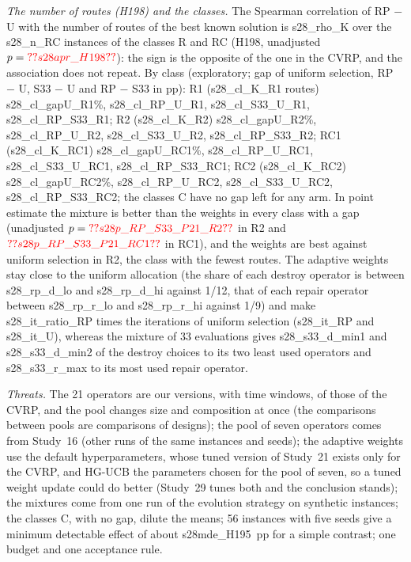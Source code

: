 \emph{The number of routes (H198) and the classes.} The Spearman correlation of RP $-$ U with the number of routes of the best known solution is \num{s28_rho_K} over the \num{s28_n_RC} instances of the classes R and RC (H198, unadjusted $p=\num{s28apr_H198}$): the sign is the opposite of the one in the CVRP, and the association does not repeat. By class (exploratory; gap of uniform selection, RP $-$ U, S33 $-$ U and RP $-$ S33 in pp): R1 (\num{s28_cl_K_R1} routes) \num{s28_cl_gapU_R1}\%, \num{s28_cl_RP_U_R1}, \num{s28_cl_S33_U_R1}, \num{s28_cl_RP_S33_R1}; R2 (\num{s28_cl_K_R2}) \num{s28_cl_gapU_R2}\%, \num{s28_cl_RP_U_R2}, \num{s28_cl_S33_U_R2}, \num{s28_cl_RP_S33_R2}; RC1 (\num{s28_cl_K_RC1}) \num{s28_cl_gapU_RC1}\%, \num{s28_cl_RP_U_RC1}, \num{s28_cl_S33_U_RC1}, \num{s28_cl_RP_S33_RC1}; RC2 (\num{s28_cl_K_RC2}) \num{s28_cl_gapU_RC2}\%, \num{s28_cl_RP_U_RC2}, \num{s28_cl_S33_U_RC2}, \num{s28_cl_RP_S33_RC2}; the classes C have no gap left for any arm. In point estimate the mixture is better than the weights in every class with a gap (unadjusted $p=\num{s28p_RP_S33_P21_R2}$ in R2 and $\num{s28p_RP_S33_P21_RC1}$ in RC1), and the weights are best against uniform selection in R2, the class with the fewest routes. The adaptive weights stay close to the uniform allocation (the share of each destroy operator is between \num{s28_rp_d_lo} and \num{s28_rp_d_hi} against 1/12, that of each repair operator between \num{s28_rp_r_lo} and \num{s28_rp_r_hi} against 1/9) and make \num{s28_it_ratio_RP} times the iterations of uniform selection (\num{s28_it_RP} and \num{s28_it_U}), whereas the mixture of 33 evaluations gives \num{s28_s33_d_min1} and \num{s28_s33_d_min2} of the destroy choices to its two least used operators and \num{s28_s33_r_max} to its most used repair operator.

\emph{Threats.} The 21 operators are our versions, with time windows, of those of the CVRP, and the pool changes size and composition at once (the comparisons between pools are comparisons of designs); the pool of seven operators comes from Study~16 (other runs of the same instances and seeds); the adaptive weights use the default hyperparameters, whose tuned version of Study~21 exists only for the CVRP, and HG-UCB the parameters chosen for the pool of seven, so a tuned weight update could do better (Study~29 tunes both and the conclusion stands); the mixtures come from one run of the evolution strategy on synthetic instances; the classes C, with no gap, dilute the means; 56 instances with five seeds give a minimum detectable effect of about \num{s28mde_H195}~pp for a simple contrast; one budget and one acceptance rule.

